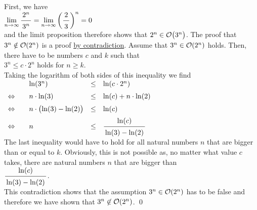 \proof
 First, we have \\[0.2cm]
\hspace*{1.3cm} 
$\displaystyle\lim\limits_{n \rightarrow \infty} \bruch{2^n}{3^n} = 
 \lim\limits_{n \rightarrow \infty} \left(\bruch{2}{3}\right)^n = 0$
\\[0.2cm]
and the limit proposition therefore shows that $2^n \in \mathcal{O}\bigl(3^n\bigr)$.  The proof that $3^n \notin
\mathcal{O}(2^n)$ is a  proof\linebreak
\href{https://en.wikipedia.org/wiki/Proof_by_contradiction}{by contradiction}.  Assume that 
$3^n \in \mathcal{O}(2^n)$ holds.  Then, there have to be numbers $c$ and $k$ such that 
\\[0.2cm]
\hspace*{1.3cm}
$3^n \leq c \cdot 2^n$ \quad holds for $n \geq k$. 
\\[0.2cm]
Taking the logarithm of both sides of this inequality we find 
\\[0.2cm]
\hspace*{1.3cm}
$
\begin{array}{llcl}
                & \ln(3^n) & \leq & \ln(c \cdot 2^n) \\[0.2cm]
\Leftrightarrow\quad &  n \cdot \ln(3) & \leq & \ln(c) + n \cdot \ln(2) \\[0.2cm]
\Leftrightarrow &  n \cdot \bigl(\ln(3) - \ln(2)\bigr) & \leq & \ln(c)  \\[0.2cm]
\Leftrightarrow &  n  & \leq & \bruch{\ln(c)}{\ln(3) - \ln(2)}          \\[0.2cm]
\end{array}
$
\\[0.2cm]
The last inequality would have to hold for all natural numbers $n$ that are bigger than or equal to $k$.  Obviously,
this is not possible as, no matter what value $c$ takes, there are natural numbers $n$ that are bigger than 
\\[0.2cm]
\hspace*{1.3cm}
$\bruch{\ln(c)}{\ln(3) - \ln(2)}$.
\\[0.2cm]
This contradiction shows that the assumption $3^n \in \mathcal{O}(2^n)$ has to be false and therefore we have shown
that $3^n \not\in \mathcal{O}(2^n)$.
\qed

